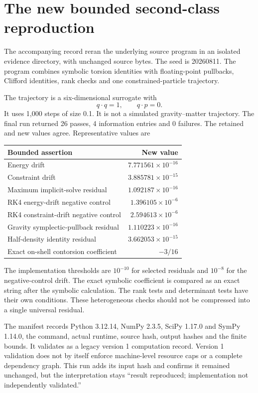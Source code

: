 \clearpage
\section{The new bounded second-class reproduction}\label{c:verify:run}

The accompanying record reran the underlying source program  in an isolated evidence directory, with unchanged source bytes. The seed is 20260811. The program combines symbolic torsion identities with floating-point pullbacks, Clifford identities, rank checks and one constrained-particle trajectory.

The trajectory is a six-dimensional surrogate with
\[
 q\cdot q=1,\qquad q\cdot p=0.
\]
It uses 1,000 steps of size 0.1. It is not a simulated gravity--matter trajectory. The final run returned 26 passes, 4 information entries and 0 failures. The retained and new values agree. Representative values are

\begin{center}
\begin{tabular}{@{}lr@{}}
\toprule
Bounded assertion & New value\\
\midrule
Energy drift & \(7.771561\times10^{-16}\)\\
Constraint drift & \(3.885781\times10^{-15}\)\\
Maximum implicit-solve residual & \(1.092187\times10^{-16}\)\\
RK4 energy-drift negative control & \(1.396105\times10^{-6}\)\\
RK4 constraint-drift negative control & \(2.594613\times10^{-6}\)\\
Gravity symplectic-pullback residual & \(1.110223\times10^{-16}\)\\
Half-density identity residual & \(3.662053\times10^{-15}\)\\
Exact on-shell contorsion coefficient & \(-3/16\)\\
\bottomrule
\end{tabular}
\end{center}

The implementation thresholds are \(10^{-10}\) for selected residuals and \(10^{-8}\) for the negative-control drift. The exact symbolic coefficient is compared as an exact string after the symbolic calculation. The rank tests and determinant tests have their own conditions. These heterogeneous checks should not be compressed into a single universal residual.

The manifest records Python 3.12.14, NumPy 2.3.5, SciPy 1.17.0 and SymPy 1.14.0, the command, actual runtime, source hash, output hashes and the finite bounds. It validates as a legacy version 1 computation record. Version 1 validation does not by itself enforce machine-level resource caps or a complete dependency graph. This run adds its input hash and confirms it remained unchanged, but the interpretation stays ``result reproduced; implementation not independently validated.''



